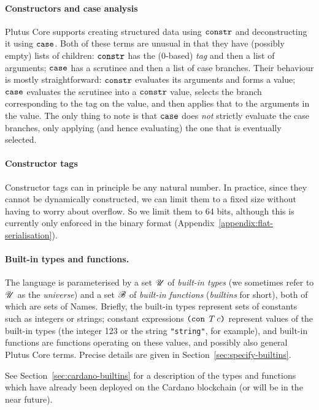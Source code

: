 \paragraph{Constructors and case analysis}
Plutus Core supports creating structured data using $\texttt{constr}$ and deconstructing
it using $\texttt{case}$. Both of these terms are unusual in that they have (possibly
empty) lists of children: $\texttt{constr}$ has the (0-based) \emph{tag} and then a list of arguments;
$\texttt{case}$ has a scrutinee and then a list of case branches. Their behaviour is mostly
straightforward: $\texttt{constr}$ evaluates its arguments and forms a value; $\texttt{case}$
evaluates the scrutinee into a $\texttt{constr}$ value, selects the branch corresponding to
the tag on the value, and then applies that to the arguments in the value. The only thing
to note is that $\texttt{case}$ does \emph{not} strictly evaluate the case branches, only
applying (and hence evaluating) the one that is eventually selected.

\paragraph{Constructor tags}
Constructor tags can in principle be any natural number. In practice, since they cannot
be dynamically constructed, we can limit them to a fixed size without having to worry
about overflow. So we limit them to 64 bits, although this is currently only enforced in
the binary format (Appendix~\ref{appendix:flat-serialisation}).

\paragraph{Built-in types and functions.} The language is parameterised by a set $\mathscr{U}$ of
\textit{built-in types} (we sometimes refer to $\mathscr{U}$ as the \textit{universe})
and a set $\mathscr{B}$ of \textit{built-in functions} (\textit{builtins} for short),
both of which are sets of Names.  Briefly, the built-in types represent sets of
constants such as integers or strings; constant expressions $\texttt{(} \texttt{con} ~ \textit{T} ~ c \texttt{)}$
represent values of the built-in types (the integer 123 or the string
\texttt{"string"}, for example), and built-in functions are functions operating
on these values, and possibly also general Plutus Core terms.  Precise details
are given in Section~\ref{sec:specify-builtins}.

See Section~\ref{sec:cardano-builtins}
for a description of the types and functions which have already been deployed on
the Cardano blockchain (or will be in the near future).

